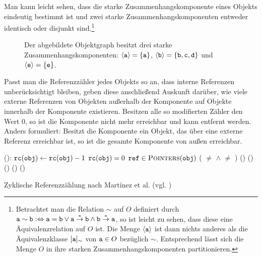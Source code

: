Man kann leicht sehen, dass die starke Zusammenhangskomponente eines Objekts eindeutig bestimmt ist und zwei starke Zusammenhangskomponenten entweder identisch oder disjunkt sind.\footnote{Betrachtet man die Relation $\sim$ auf $O$ definiert durch $\texttt{a} \sim \texttt{b} :\Leftrightarrow \texttt{a} = \texttt{b} \vee \texttt{a} \overset{*}{\rightarrow} \texttt{b} \wedge \texttt{b} \overset{*}{\rightarrow} \texttt{a}$, so ist leicht zu sehen, dass diese eine Äquivalenzrelation auf $O$ ist. Die Menge $\left\langle\texttt{a}\right\rangle$ ist dann nichts anderes als die Äquivalenzklasse $[\texttt{a}]_{\sim}$ von $\texttt{a} \in O$ bezüglich $\sim$. Entsprechend lässt sich die Menge $O$ in ihre starken Zusammenhangskomponenten partitionieren.}

\begin{figure}[h]
	\centering
	
	\caption[Beispiel für starke Zusammenhangskomponenten]{Der abgebildete Objektgraph besitzt drei starke Zusammenhangskomponenten: $\left\langle\texttt{a}\right\rangle = \{\texttt{a}\}$, $\left\langle\texttt{b}\right\rangle = \{\texttt{b}, \texttt{c}, \texttt{d}\}$ und $\left\langle\texttt{e}\right\rangle = \{\texttt{e}\}$.}
	\label{fig:rc-scc}
\end{figure}

Passt man die Referenzzähler jedes Objekts so an, dass interne Referenzen unberücksichtigt bleiben, geben diese anschließend Auskunft darüber, wie viele externe Referenzen von Objekten außerhalb der Komponente auf Objekte innerhalb der Komponente existieren.
Besitzen alle so modifierten Zähler den Wert $0$, so ist die Komponente nicht mehr erreichbar und kann entfernt werden.
Anders formuliert: Besitzt die Komponente ein Objekt, das über eine externe Referenz erreichbar ist, so ist die gesamte Komponente von außen erreichbar.

\begin{algorithm}[h]
\begin{algorithmic}[1]
	\State {}():
	\State \quad $\texttt{rc}(\texttt{obj}) \gets \texttt{rc}(\texttt{obj}) - 1$
	\State \quad \IF $\texttt{rc}(\texttt{obj}) = 0$
	\State \quad \quad \FOREACH $\texttt{ref} \in \textsc{Pointers}(\texttt{obj})$
	\State \quad \quad \quad \IF ( $\neq$ \Null $\wedge$  $\neq$ )
	\State \quad \quad \quad \quad {}()
	\State \quad \quad {}()
	\State \quad \ELSE
	\State \quad \quad {}()		
	\State \quad \quad {}()		
	\State \quad \quad {}()	
\end{algorithmic}
\caption[Zyklische Referenzzählung]{Zyklische Referenzzählung nach Martínez et al. (vgl. \cite[S. 32]{martinez1990})}
\label{algo:cyclic-rc}
\end{algorithm}

